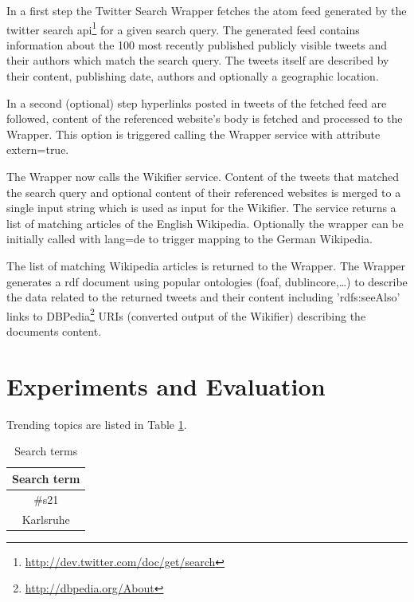 \documentclass{llncs}
\begin{document}
In a first step the Twitter Search Wrapper fetches the atom feed
generated by the twitter search
api\footnote{\url{http://dev.twitter.com/doc/get/search}} for a given search
query. The generated feed contains information about the 100 most recently published publicly visible tweets and
their authors which match the search query. The tweets itself are described by
their content, publishing date, authors and optionally a geographic location. 

In a second (optional) step hyperlinks posted in tweets of the fetched
feed are followed, content of the referenced website's body is fetched and
processed to the Wrapper. This option is triggered calling the Wrapper
service with attribute extern=true.

The Wrapper now calls the Wikifier \cite{key:wikifier} service. Content of the
tweets that matched the search query and optional content of their referenced websites is merged
to a single input string which is used as input for the Wikifier. The service
returns a list of matching articles of the English
Wikipedia. Optionally the wrapper can be initially called with lang=de to
trigger mapping to the German Wikipedia.

The list of matching Wikipedia articles is returned to the Wrapper. The Wrapper
generates a rdf document using popular ontologies (foaf, dublincore,\ldots) to
describe the data related to the returned tweets and their content including 'rdfs:seeAlso' links to
DBPedia\footnote{\url{http://dbpedia.org/About}} URIs (converted output of the
Wikifier) describing the documents content.

\section{Experiments and Evaluation}
\label{sect:eval}

Trending topics are listed in Table \ref{tbl:terms}.

\begin{table}[ht*]
\centering
\begin{tabular}{ c }
Search term                    \\
\hline
\#s21 \\
Karlsruhe\\
\end{tabular}
\caption{Search terms}\label{tbl:terms}
\end{table}

\begin{definition}[Stability]

\end{definition}
\end{document}

